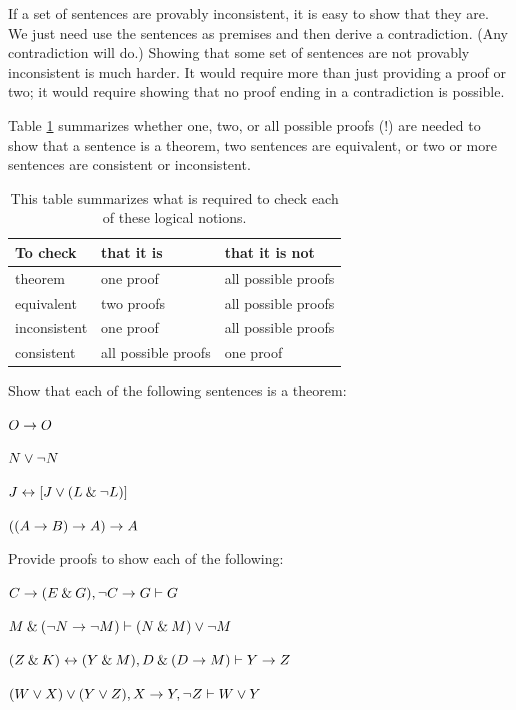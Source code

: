 If a set of sentences are provably inconsistent, it is easy to show that they are. We just need use the sentences as premises and then derive a contradiction. (Any contradiction will do.) Showing that some set of sentences are not provably inconsistent is much harder. It would require more than just providing a proof or two; it would require showing that no proof ending in a contradiction is possible.

Table \ref{table.one-mult-proofs} summarizes whether one, two, or all possible proofs (!) are needed to show that a sentence is a theorem, two sentences are equivalent, or two or more sentences are consistent or inconsistent. 

\begin{table}\centering\sffamily\footnotesize
{}
\begin{tabular}{@{}l l l@{}}\toprule
To check & that it is & that it is not\\\midrule
theorem & one proof & all possible proofs\\
equivalent & two proofs & all possible proofs\\
inconsistent &  one proof  & all possible proofs\\
consistent & all possible proofs & one proof\\
\bottomrule
\end{tabular}
\caption{This table summarizes what is required to check each of these logical notions.}\label{table.one-mult-proofs}
\end{table}


\practiceproblems
\problempart
Show that each of the following sentences is a theorem:
\begin{earg}
\item $O \rightarrow O$
\item $N \vee {\neg} N$
\item $J \leftrightarrow [J\vee (L\mathbin{\&}{\neg} L)]$
\item $((A \rightarrow B) \rightarrow A) \rightarrow A$ 
\end{earg}

\problempart
Provide proofs to show each of the following:
\begin{earg}
\item $C\rightarrow(E\mathbin{\&} G), {\neg} C \rightarrow G \vdash G$
\item $M \mathbin{\&} ({\neg} N \rightarrow {\neg} M) \vdash (N \mathbin{\&} M) \vee {\neg} M$
\item $(Z\mathbin{\&} K)\leftrightarrow(Y\mathbin{\&} M), D\mathbin{\&}(D\rightarrow M) \vdash Y\rightarrow Z$
\item $(W \vee X) \vee (Y \vee Z), X\rightarrow Y, {\neg} Z \vdash W\vee Y$
\end{earg}

